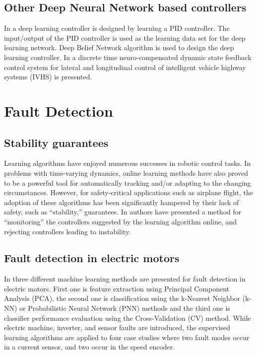 \documentclass[conference]{IEEEtran}
\begin{document}
\subsection{\textbf{Other Deep Neural Network based controllers}}

In \cite{aamir13pid} a deep learning controller is designed by learning a PID controller. The input/output of the PID controller is used as the learning data set for the deep learning network. Deep Belief Network algorithm is used to design the deep learning controller. In \cite{kumarawadu2010discrete-time} a discrete time neuro-compensated dynamic state feedback control system for lateral and longitudinal control of intelligent vehicle highway systems (IVHS) is presented.




\section{Fault Detection}

\subsection{\textbf{Stability guarantees}}

Learning algorithms have enjoyed numerous successes in robotic control tasks. In problems with time-varying dynamics, online learning methods have also proved to be a powerful tool for automatically tracking and/or adapting to the changing circumstances. However, for safety-critical applications such as airplane flight, the adoption of these algorithms has been significantly hampered by their lack of safety, such as “stability,” guarantees. In \cite{kim2005nips} authors have presented a method for “monitoring” the controllers suggested by the learning algorithm online, and rejecting controllers leading to instability.

\subsection{\textbf{Fault detection in electric motors}}

In \cite{silva2013fault} three different machine learning methods are presented for fault detection in electric motors. First one is feature extraction using Principal Component Analysis (PCA), the second one is classification using the k-Nearest Neighbor (k-NN) or Probabilistic Neural Network (PNN) methods and the third one is classifier performance evaluation using the Cross-Validation (CV) method. While electric machine, inverter, and sensor faults are introduced, the supervised learning algorithms are applied to four case studies where two fault modes occur in a current sensor, and two occur in the speed encoder.
\end{document}
